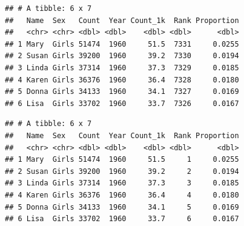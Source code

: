 \documentclass[]{book}
\newenvironment{Shaded}{\begin{snugshade}}{\end{snugshade}}
\newcommand{\CommentTok}[1]{\textcolor[rgb]{0.56,0.35,0.01}{\textit{#1}}}
\newcommand{\DataTypeTok}[1]{\textcolor[rgb]{0.13,0.29,0.53}{#1}}
\newcommand{\KeywordTok}[1]{\textcolor[rgb]{0.13,0.29,0.53}{\textbf{#1}}}
\newcommand{\NormalTok}[1]{#1}
\newcommand{\OperatorTok}[1]{\textcolor[rgb]{0.81,0.36,0.00}{\textbf{#1}}}
\newcommand{\StringTok}[1]{\textcolor[rgb]{0.31,0.60,0.02}{#1}}
\begin{document}
\begin{Shaded}
\end{Shaded}

\begin{verbatim}
## # A tibble: 6 x 7
##   Name  Sex   Count  Year Count_1k  Rank Proportion
##   <chr> <chr> <dbl> <dbl>    <dbl> <dbl>      <dbl>
## 1 Mary  Girls 51474  1960     51.5  7331     0.0255
## 2 Susan Girls 39200  1960     39.2  7330     0.0194
## 3 Linda Girls 37314  1960     37.3  7329     0.0185
## 4 Karen Girls 36376  1960     36.4  7328     0.0180
## 5 Donna Girls 34133  1960     34.1  7327     0.0169
## 6 Lisa  Girls 33702  1960     33.7  7326     0.0167
\end{verbatim}

\begin{Shaded}
\end{Shaded}

\begin{verbatim}
## # A tibble: 6 x 7
##   Name  Sex   Count  Year Count_1k  Rank Proportion
##   <chr> <chr> <dbl> <dbl>    <dbl> <dbl>      <dbl>
## 1 Mary  Girls 51474  1960     51.5     1     0.0255
## 2 Susan Girls 39200  1960     39.2     2     0.0194
## 3 Linda Girls 37314  1960     37.3     3     0.0185
## 4 Karen Girls 36376  1960     36.4     4     0.0180
## 5 Donna Girls 34133  1960     34.1     5     0.0169
## 6 Lisa  Girls 33702  1960     33.7     6     0.0167
\end{verbatim}
\end{document}
